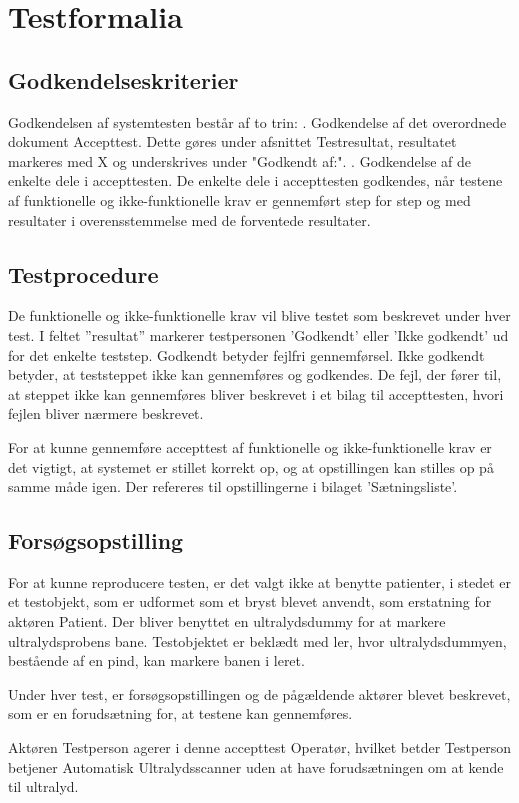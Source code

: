 \chapter{Testformalia}\label{Testformlia}

\section{Godkendelseskriterier}
Godkendelsen af systemtesten består af to trin: 
. Godkendelse af det overordnede dokument Accepttest. Dette gøres under afsnittet Testresultat, resultatet markeres med X og underskrives under "Godkendt af:".
. Godkendelse af de enkelte dele i accepttesten. De enkelte dele i accepttesten godkendes, når testene af funktionelle og ikke-funktionelle krav er gennemført step for step og med resultater
i overensstemmelse med de forventede resultater.

\section{Testprocedure}
De funktionelle og ikke-funktionelle krav vil blive testet som beskrevet under hver test. I feltet ”resultat” markerer testpersonen 'Godkendt' eller 'Ikke godkendt' ud for det enkelte teststep. 
Godkendt betyder fejlfri gennemførsel. 
Ikke godkendt betyder, at teststeppet ikke kan gennemføres og godkendes. De fejl, der fører til, at steppet ikke kan gennemføres bliver beskrevet i et bilag til accepttesten, hvori fejlen bliver nærmere beskrevet. 

For at kunne gennemføre accepttest af funktionelle og ikke-funktionelle krav er det vigtigt, at systemet er stillet korrekt op, og at opstillingen kan stilles op på samme måde igen. Der refereres til opstillingerne i bilaget 'Sætningsliste'. 

\section{Forsøgsopstilling}
For at kunne reproducere testen, er det valgt ikke at benytte patienter, i stedet er et testobjekt, som er udformet som et bryst blevet anvendt, som erstatning for aktøren Patient. Der bliver benyttet en ultralydsdummy for at markere ultralydsprobens bane.  Testobjektet er beklædt med ler, hvor ultralydsdummyen, bestående af en pind, kan markere banen i leret.  

Under hver test, er forsøgsopstillingen og de pågældende aktører blevet beskrevet, som er en forudsætning for, at testene kan gennemføres. 

Aktøren Testperson agerer i denne accepttest Operatør, hvilket betder Testperson betjener Automatisk Ultralydsscanner uden at have forudsætningen om at kende til ultralyd. 